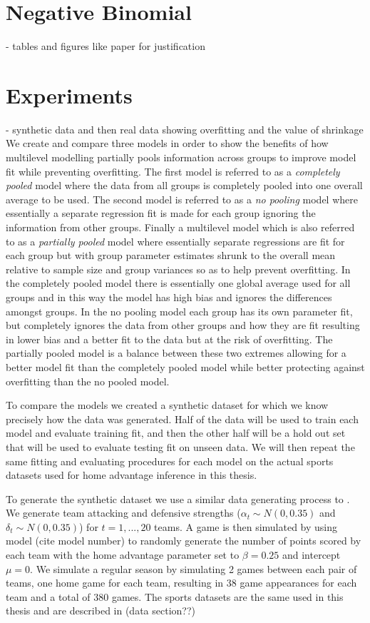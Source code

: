 \section{Negative Binomial}

- tables and figures like paper for justification

\section{Experiments}

- synthetic data and then real data showing overfitting and the value of shrinkage
We create and compare three models in order to show the benefits of how multilevel modelling partially pools information across groups to improve model fit while preventing overfitting. The first model is referred to as a \textit{completely pooled} model where the data from all groups is completely pooled into one overall average to be used. The second model is referred to as a \textit{no pooling} model where essentially a separate regression fit is made for each group ignoring the information from other groups. Finally a multilevel model which is also referred to as a \textit{partially pooled} model where essentially separate regressions are fit for each group but with group parameter estimates shrunk to the overall mean relative to sample size and group variances so as to help prevent overfitting. In the completely pooled model there is essentially one global average used for all groups and in this way the model has high bias and ignores the differences amongst groups. In the no pooling model each group has its own parameter fit, but completely ignores the data from other groups and how they are fit resulting in lower bias and a better fit to the data but at the risk of overfitting. The partially pooled model is a balance between these two extremes allowing for a better model fit than the completely pooled model while better protecting against overfitting than the no pooled model.

To compare the models we created a synthetic dataset for which we know precisely how the data was generated. Half of the data will be used to train each model and evaluate training fit, and then the other half will be a hold out set that will be used to evaluate testing fit on unseen data. We will then repeat the same fitting and evaluating procedures for each model on the actual sports datasets used for home advantage inference in this thesis.

To generate the synthetic dataset we use a similar data generating process to \cite{Benz2020}. We generate team attacking and defensive strengths (\(\alpha_t \sim N(0, 0.35)\) and \(\delta_t \sim N(0, 0.35)\)) for \(t=1,...,20\) teams. A game is then simulated by using model (cite model number) to randomly generate the number of points scored by each team with the home advantage parameter set to \(\beta = 0.25\) and intercept \(\mu = 0\). We simulate a regular season by simulating 2 games between each pair of teams, one home game for each team, resulting in \(38\) game appearances for each team and a total of \(380\) games. The sports datasets are the same used in this thesis and are described in (data section??)

